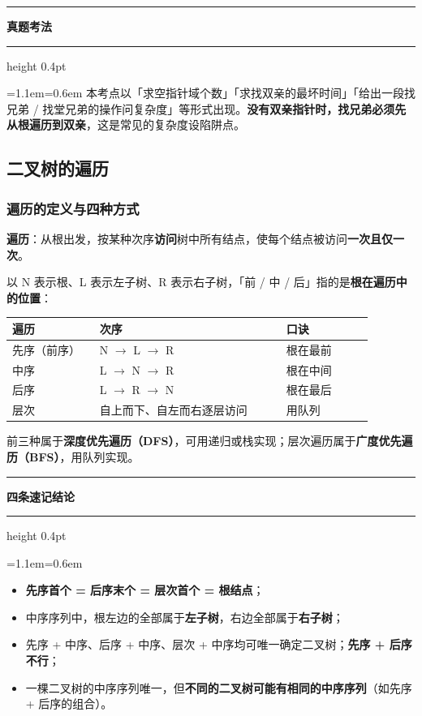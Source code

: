 \documentclass[11pt,openany,UTF8]{ctexbook}
\newcommand{\callouthead}[2]{%
  \par\addvspace{7pt}\noindent
  {\color{#1}\rule[-0.15em]{3pt}{1.05em}}\hspace{0.5em}%
  {\bfseries\color{#1}#2}\par\nobreak\vspace{-0.35em}%
  {\color{rulesep}\hrule height 0.4pt}\nobreak\vspace{0.45em}%
  \begingroup\small\setlength{\parindent}{0pt}%
  \leftskip=1.1em\rightskip=0.6em\noindent\ignorespaces}
\newcommand{\calloutend}{\par\endgroup\addvspace{7pt}}
\newenvironment{callkey}[1]{\callouthead{keybar}{#1}}{\calloutend}
\newenvironment{callexam}[1]{\callouthead{exambar}{#1}}{\calloutend}
\begin{document}
\begin{callexam}{真题考法}
本考点以「求空指针域个数」「求找双亲的最坏时间」「给出一段找兄弟 / 找堂兄弟的操作问复杂度」等形式出现。\textbf{没有双亲指针时，找兄弟必须先从根遍历到双亲}，这是常见的复杂度设陷阱点。

\end{callexam}

\subsection{二叉树的遍历}

\subsubsection{遍历的定义与四种方式}

\textbf{遍历}：从根出发，按某种次序\textbf{访问}树中所有结点，使每个结点被访问\textbf{一次且仅一次}。

以 N 表示根、L 表示左子树、R 表示右子树，「前 / 中 / 后」指的是\textbf{根在遍历中的位置}：

\begingroup\small\setlength{\tabcolsep}{4.0pt}
\begin{longtable}{@{}L{0.2265\linewidth}L{0.4756\linewidth}L{0.2265\linewidth}@{}}
\toprule
\textbf{遍历} & \textbf{次序} & \textbf{口诀} \\
\midrule
\endhead
先序（前序） & N $\to$ L $\to$ R & 根在最前 \\
中序 & L $\to$ N $\to$ R & 根在中间 \\
后序 & L $\to$ R $\to$ N & 根在最后 \\
层次 & 自上而下、自左而右逐层访问 & 用队列 \\
\bottomrule
\end{longtable}
\endgroup

前三种属于\textbf{深度优先遍历（DFS）}，可用递归或栈实现；层次遍历属于\textbf{广度优先遍历（BFS）}，用队列实现。

\begin{callkey}{四条速记结论}
\begin{itemize}
\item \textbf{先序首个 = 后序末个 = 层次首个 = 根结点}；
\item 中序序列中，根左边的全部属于\textbf{左子树}，右边全部属于\textbf{右子树}；
\item 先序 + 中序、后序 + 中序、层次 + 中序均可唯一确定二叉树；\textbf{先序 + 后序不行}；
\item 一棵二叉树的中序序列唯一，但\textbf{不同的二叉树可能有相同的中序序列}（如先序 + 后序的组合）。
\end{itemize}
\end{callkey}
\end{document}
